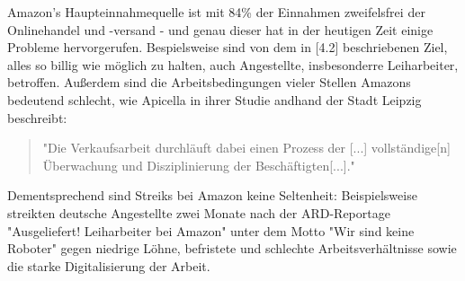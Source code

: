 Amazon’s Haupteinnahmequelle ist mit 84\% der Einnahmen zweifelsfrei der Onlinehandel und -versand\cite[Abb. 5]{Desjardins} - und genau dieser hat in der heutigen Zeit einige Probleme hervorgerufen. Bespielsweise sind von dem in [4.2] beschriebenen Ziel, alles so billig wie möglich zu halten, auch Angestellte, insbesonderre Leiharbeiter, betroffen\cite[S. 6]{Apicella}. Außerdem sind die Arbeitsbedingungen vieler Stellen Amazons bedeutend schlecht, wie Apicella in ihrer Studie andhand der Stadt Leipzig beschreibt\cite[S. 29]{Apicella}:
\begin{quote}
"Die Verkaufsarbeit durchläuft dabei einen Prozess der [...] vollständige[n] Überwachung und Disziplinierung der Beschäftigten[...]."
\end{quote}
Dementsprechend sind Streiks bei Amazon keine Seltenheit: Beispielsweise streikten deutsche Angestellte zwei Monate nach der ARD-Reportage "Ausgeliefert! Leiharbeiter bei Amazon"\cite{Ausgeliefert} unter dem Motto "Wir sind keine Roboter" gegen niedrige Löhne, befristete und schlechte Arbeitsverhältnisse sowie die starke Digitalisierung der Arbeit\cite[S. 6]{Apicella}.



\iffalse

dynamic pricing https://www.exeo-consulting.com/pdf/exeo_Dynamic%

Arbeitsbedingungen https://www.rosalux.de/fileadmin/rls_uploads/pdfs/Studien/Studien_09-16_Amazon_Leipzig.pdf


  >billg-wettbewerb: amazon macht tlw. verlust, um andere zu verdrängen, zB Prime Versand an einem Tag
  >verbilligung: Lohn und Arbeitsbedingungen schlecht "verbilligung nicht nur auf kosten des Gewinns, sondern auch der Arbeiter"



>CORONA, besordere Artikel wie Toilettenpapier oder desinfektionsmittel

>WEGSCHMEI?EN ABGELAUFENER LEBENSMITTEL > onlinehandel wenoger sclimm weil spielraum
-> TAUSCH REINFFOLGE   AMAZON - AUSWIRKUNGEN ONLINEHANDEL AUF INFRASTRUKTUR
DIE IN 5.1 BESCHRIEBENE AUSBEUTUNG UND VERBILLIGUNG WURDE GRÖ?TENTEILS DURCH AMZON HERVORGERUFEN

>Ausnutzung
>Kontakt mit Amazon

>Schlussfolgerungen: auf Tühringen übertragbar, weil 

9.3 Schlussfolgerungen*/
\fi
